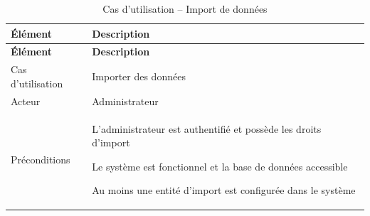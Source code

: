 \begin{longtable}{|l|p{12cm}|}
\caption{Cas d'utilisation – Import de données}
\label{tab:import_donnees} \\
\hline
\textbf{Élément} & \textbf{Description} \\
\hline
\endfirsthead
\hline
\textbf{Élément} & \textbf{Description} \\
\hline
\endhead

Cas d'utilisation & 

 Importer des données
\\
\hline
Acteur & 
  Administrateur
 \\
\hline
Préconditions & 

    L'administrateur est authentifié et possède les droits d'import
     
    Le système est fonctionnel et la base de données accessible
     
     Au moins une entité d'import est configurée dans le système
   

\end{longtable}
